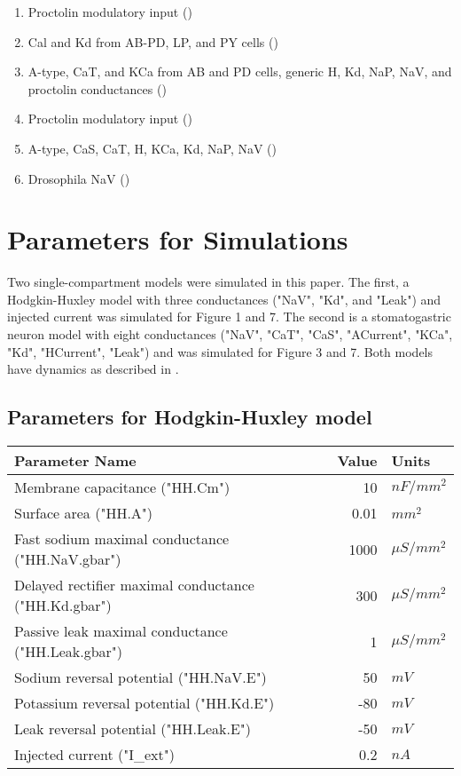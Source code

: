 \documentclass[utf8]{frontiers_suppmat} %
\begin{document}
\begin{enumerate}
		\item Proctolin modulatory input (\cite{sharpDynamicClampComputergenerated1993})
		\item Cal and Kd from AB-PD, LP, and PY cells (\cite{soto-trevinoActivitydependentModificationInhibitory2001})
		\item A-type, CaT, and KCa from AB and PD cells, generic H, Kd, NaP, NaV, and proctolin conductances (\cite{soto-trevinoComputationalModelElectrically2005})
		\item Proctolin modulatory input (\cite{swensenModulatorsConvergentCellular2001})
		\item A-type, CaS, CaT, H, KCa, Kd, NaP, NaV (\cite{turrigianoSelectiveRegulationCurrent1995})
		\item Drosophila NaV (\cite{wicherNonsynapticIonChannels2001})
	\end{enumerate}

\section{Parameters for Simulations}

	Two single-compartment models were simulated in this paper. The first, a Hodgkin-Huxley model with three conductances ("NaV", "Kd", and "Leak") and injected current was simulated for Figure 1 and 7. The second is a stomatogastric neuron model with eight conductances ("NaV", "CaT", "CaS", "ACurrent", "KCa", "Kd", "HCurrent", "Leak") and was simulated for Figure 3 and 7. Both models have dynamics as described in \cite{liuModelNeuronActivityDependent1998}.
	
	\subsection{Parameters for Hodgkin-Huxley model} 
	
		\begin{center}
			\begin{tabular}{|l|r|l|}
				\hline 
				\textbf{Parameter Name} & \textbf{Value} & \textbf{Units} \\ 
				\hline 
				Membrane capacitance ("HH.Cm") & 10 & ${nF}/{mm^2}$ \\ 
				\hline 
				Surface area ("HH.A") & 0.01 & $mm^2$ \\ 
				\hline 
				Fast sodium maximal conductance ("HH.NaV.gbar") & 1000 & $\mu S/mm^2$ \\ 
				\hline 
				Delayed rectifier maximal conductance ("HH.Kd.gbar") & 300 & $\mu S/mm^2$ \\ 
				\hline 
				Passive leak maximal conductance ("HH.Leak.gbar") & 1 & $\mu S/mm^2$ \\ 
				\hline 
				Sodium reversal potential ("HH.NaV.E") & 50 & $mV$ \\ 
				\hline 
				Potassium reversal potential ("HH.Kd.E") & -80 & $mV$ \\ 
				\hline
				Leak reversal potential ("HH.Leak.E") & -50 & $mV$ \\
				\hline
				Injected current ("I_ext") & 0.2 & $nA$ \\
				\hline 
			\end{tabular} 
		\end{center}
	
\end{document}
